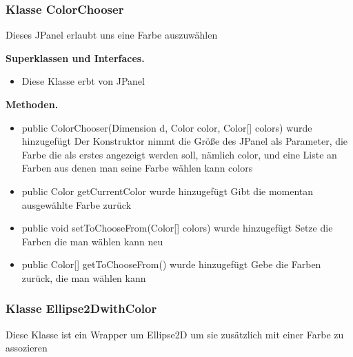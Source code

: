 \documentclass{article}
\begin{document}
	\subsubsection{Klasse ColorChooser}
    Dieses JPanel erlaubt uns eine Farbe auszuwählen\newline

	    \textbf{Superklassen und Interfaces.}\newline
	   \begin{itemize}
            \item Diese Klasse erbt von JPanel\newline
           \end{itemize}

    \textbf{Methoden.}\newline
	   \begin{itemize}
           \item public ColorChooser(Dimension d, Color color, Color[] colors) wurde hinzugefügt\newline
               Der Konstruktor nimmt die Größe des JPanel als Parameter,\newline
               die Farbe die als erstes angezeigt werden soll, nämlich color,\newline
               und eine Liste an Farben aus denen man seine Farbe wählen kann colors\newline
           \item public Color getCurrentColor wurde hinzugefügt\newline
               Gibt die momentan ausgewählte Farbe zurück\newline
           \item public void setToChooseFrom(Color[] colors) wurde hinzugefügt\newline
               Setze die Farben die man wählen kann neu\newline
           \item public Color[] getToChooseFrom() wurde hinzugefügt\newline
               Gebe die Farben zurück, die man wählen kann\newline
           \end{itemize}

	\subsubsection{Klasse Ellipse2DwithColor}
    Diese Klasse ist ein Wrapper um Ellipse2D um\newline
    sie zusätzlich mit einer Farbe zu assozieren\newline
\end{document}
